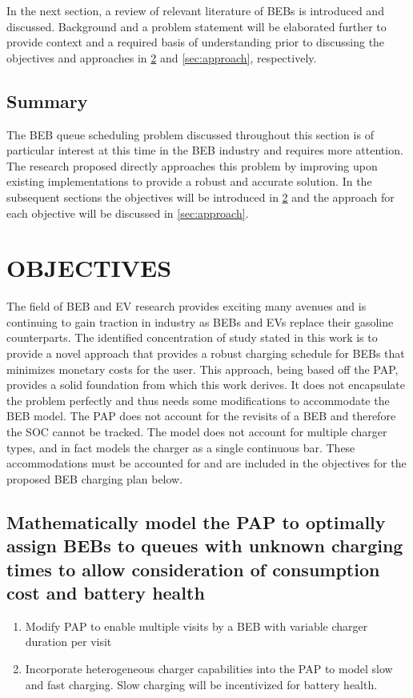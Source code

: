 \documentclass[ee,msthesis]{usuthesis}
\begin{document}
In the next section, a review of relevant literature of BEBs is introduced and discussed. Background and a problem
statement will be elaborated further to provide context and a required basis of understanding prior to discussing the
objectives and approaches in \ref{sec:objectives} and \ref{sec:approach}, respectively.

\section{Summary}
\label{sec:intro-summary}
The BEB queue scheduling problem discussed throughout this section is of particular interest at this time in the BEB
industry and requires more attention. The research proposed directly approaches this problem by improving upon existing
implementations to provide a robust and accurate solution. In the subsequent sections the objectives will be introduced
in \ref{sec:objectives} and the approach for each objective will be discussed in \ref{sec:approach}.
\chapter{OBJECTIVES}
\label{sec:objectives}
The field of BEB and EV research provides exciting many avenues and is continuing to gain traction in industry as BEBs
and EVs replace their gasoline counterparts. The identified concentration of study stated in this work is to provide a
novel approach that provides a robust charging schedule for BEBs that minimizes monetary costs for the user. This
approach, being based off the PAP, provides a solid foundation from which this work derives. It does not encapsulate the
problem perfectly and thus needs some modifications to accommodate the BEB model. The PAP does not account for the
revisits of a BEB and therefore the SOC cannot be tracked. The model does not account for multiple charger types, and in
fact models the charger as a single continuous bar. These accommodations must be accounted for and are included in the
objectives for the proposed BEB charging plan below.

\section{Mathematically model the PAP to optimally assign BEBs to queues with unknown charging times to allow consideration of consumption cost and battery health}
\label{sec:obj-math-model-pap}
\begin{enumerate}
\item Modify PAP to enable multiple visits by a BEB with variable charger duration per visit

\item Incorporate heterogeneous charger capabilities into the PAP to model slow and fast charging. Slow charging will be
incentivized for battery health.
\end{enumerate}
\end{document}
